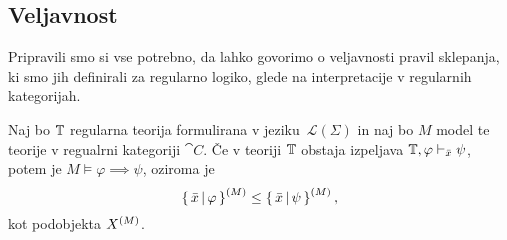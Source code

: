 \documentclass[../kategoricna_logika.tex]{subfiles}
\begin{document}
\subsection{Veljavnost}
Pripravili smo si vse potrebno, da lahko govorimo o veljavnosti pravil
sklepanja, ki smo jih definirali za regularno logiko, glede na
interpretacije v regularnih kategorijah.
\begin{izrek}[Veljavnost]
  Naj bo $\mathbb{T}$ regularna teorija formulirana v jeziku~$\mathcal{L}(\Sigma)$
  in naj bo $M$ model te teorije v regualrni kategoriji
  $\cat{C}$.  Če v teoriji $\mathbb{T}$ obstaja izpeljava $\mathbb{T}, \varphi \vdash_{\bar{x}} \psi$, potem je
  $M \models \varphi \implies \psi$, oziroma je
  \[\left\lbrace\,\bar{x} \,\middle|\, \varphi\,\right\rbrace^{(M)} \leq \left\lbrace\,\bar{x}
    \,\middle|\, \psi\,\right\rbrace^{(M)},\]
  kot podobjekta ${X}^{(M)}$.
\end{izrek}
\end{document}
